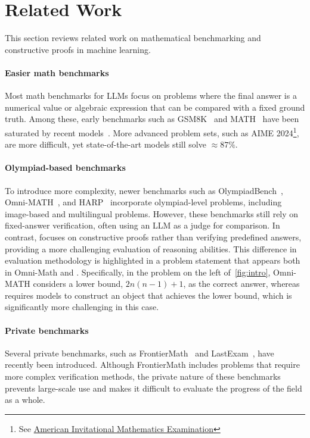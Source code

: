 \section{Related Work} \label{sec:background}

This section reviews related work on mathematical benchmarking and constructive proofs in machine learning.

\paragraph{Easier math benchmarks}
Most math benchmarks for LLMs focus on problems where the final answer is a numerical value or algebraic expression that can be compared with a fixed ground truth. Among these, early benchmarks such as GSM8K~\citep{gsm8k} and MATH~\citep{hendrycks2021math} have been saturated by recent models~\citep{openai2024o1, deepseek2025r1}. More advanced problem sets, such as AIME 2024\footnote{See \href{https://artofproblemsolving.com/wiki/index.php/2024\_AIME\_I}{American Invitational Mathematics Examination}}, are more difficult, yet state-of-the-art models still solve ${\approx}87\%$.

\paragraph{Olympiad-based benchmarks} To introduce more complexity, newer benchmarks such as OlympiadBench~\citep{olympiadbench}, Omni-MATH~\citep{omnimath}, and HARP~\citep{harp} incorporate olympiad-level problems, including image-based and multilingual problems. However, these benchmarks still rely on fixed-answer verification, often using an LLM as a judge for comparison. In contrast, \mc focuses on constructive proofs rather than verifying predefined answers, providing a more challenging evaluation of reasoning abilities. This difference in evaluation methodology is highlighted in a problem statement that appears both in Omni-Math and \mc. Specifically, in the problem on the left of~\cref{fig:intro}, Omni-MATH considers a lower bound, $2n(n-1)+1$, as the correct answer, whereas \mc requires models to construct an object that achieves the lower bound, which is significantly more challenging in this case. 

\paragraph{Private benchmarks} Several private benchmarks, such as FrontierMath~\citep{frontiermath} and \mbox{LastExam}~\citep{lastexam}, have recently been introduced. Although FrontierMath includes problems that require more complex verification methods, the private nature of these benchmarks prevents large-scale use and makes it difficult to evaluate the progress of the field as a whole.

